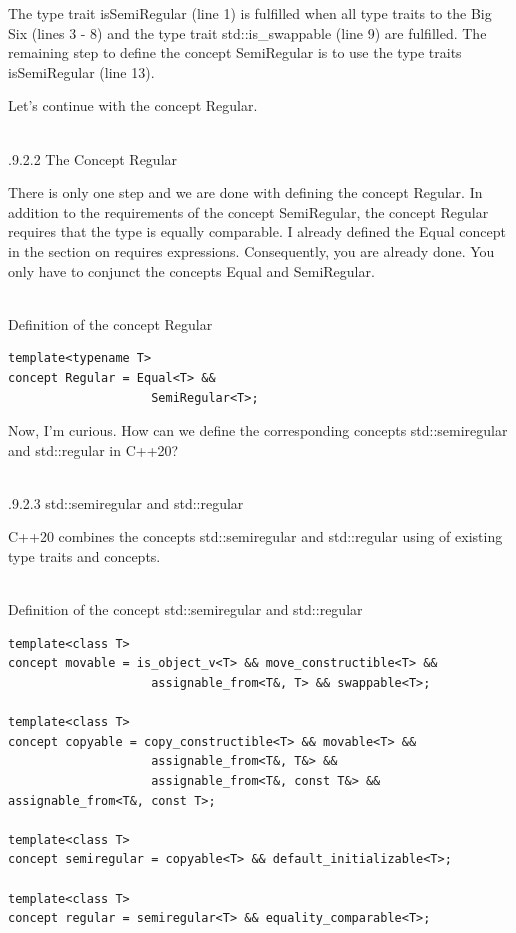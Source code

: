 The type trait isSemiRegular (line 1) is fulfilled when all type traits to the Big Six (lines 3 - 8) and the type trait std::is\_swappable (line 9) are fulfilled. The remaining step to define the concept SemiRegular is to use the type traits isSemiRegular (line 13).

Let’s continue with the concept Regular.

\hspace*{\fill} \\ %
.9.2.2\hspace{0.2cm} The Concept Regular

There is only one step and we are done with defining the concept Regular. In addition to the requirements of the concept SemiRegular, the concept Regular requires that the type is equally comparable. I already defined the Equal concept in the section on requires expressions. Consequently, you are already done. You only have to conjunct the concepts Equal and SemiRegular.

\hspace*{\fill} \\ %
\noindent
Definition of the concept Regular
\begin{lstlisting}[style=styleCXX]
template<typename T>
concept Regular = Equal<T> &&
					SemiRegular<T>;
\end{lstlisting}

Now, I’m curious. How can we define the corresponding concepts std::semiregular and std::regular in C++20?

\hspace*{\fill} \\ %
.9.2.3\hspace{0.2cm} std::semiregular and std::regular

C++20 combines the concepts std::semiregular and std::regular using of existing type traits and concepts.

\hspace*{\fill} \\ %
\noindent
Definition of the concept std::semiregular and std::regular
\begin{lstlisting}[style=styleCXX]
template<class T>
concept movable = is_object_v<T> && move_constructible<T> &&
					assignable_from<T&, T> && swappable<T>;

template<class T>
concept copyable = copy_constructible<T> && movable<T> &&
					assignable_from<T&, T&> &&
					assignable_from<T&, const T&> && assignable_from<T&, const T>;

template<class T>
concept semiregular = copyable<T> && default_initializable<T>;

template<class T>
concept regular = semiregular<T> && equality_comparable<T>;
\end{lstlisting}

